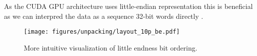 As the CUDA GPU architecture uses little-endian representation this is beneficial as we can interpred the data as a sequence 32-bit words directly \cite[127]{CUDAProgrammingGuide}.

\begin{figure}[H]
    \centering
    \texttt{[image: figures/unpacking/layout\_10p\_be.pdf]}
    \caption{More intuitive visualization of little endness bit ordering.}
    \label{fig:mono10p_reordered}
\end{figure}
